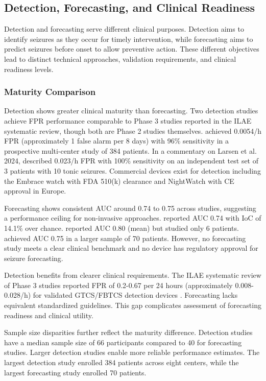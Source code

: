 \subsection{Detection, Forecasting, and Clinical Readiness}
\label{sec:detection-forecasting-readiness}

Detection and forecasting serve different clinical purposes. Detection aims to identify seizures as they occur for timely intervention, while forecasting aims to predict seizures before onset to allow preventive action. These different objectives lead to distinct technical approaches, validation requirements, and clinical readiness levels.

\subsubsection{Maturity Comparison}

Detection shows greater clinical maturity than forecasting. Two detection studies achieve FPR performance comparable to Phase 3 studies reported in the ILAE systematic review, though both are Phase 2 studies themselves. \textcite{spahrDeepLearningbasedDetection2025} achieved 0.0054/h FPR (approximately 1 false alarm per 8 days) with 96\% sensitivity in a prospective multi-center study of 384 patients. In a commentary on Larsen et al. 2024, \textcite{fineDetectionKeyAutomated2025} described 0.023/h FPR with 100\% sensitivity on an independent test set of 3 patients with 10 tonic seizures. Commercial devices exist for detection including the Embrace watch with FDA 510(k) clearance and NightWatch with CE approval in Europe.

Forecasting shows consistent AUC around 0.74 to 0.75 across studies, suggesting a performance ceiling for non-invasive approaches. \textcite{meiselMachineLearningWristband2020} reported AUC 0.74 with IoC of 14.1\% over chance. \textcite{nasseriAmbulatorySeizureForecasting2021} reported AUC 0.80 (mean) but studied only 6 patients. \textcite{vielufSeizureMonitoringCombined2025} achieved AUC 0.75 in a larger sample of 70 patients. However, no forecasting study meets a clear clinical benchmark and no device has regulatory approval for seizure forecasting.

Detection benefits from clearer clinical requirements. The ILAE systematic review of Phase 3 studies reported FPR of 0.2-0.67 per 24 hours (approximately 0.008-0.028/h) for validated GTCS/FBTCS detection devices \parencite{beniczkyAutomatedSeizureDetection2021}. Forecasting lacks equivalent standardized guidelines. This gap complicates assessment of forecasting readiness and clinical utility.

Sample size disparities further reflect the maturity difference. Detection studies have a median sample size of 66 participants compared to 40 for forecasting studies. Larger detection studies enable more reliable performance estimates. The largest detection study enrolled 384 patients across eight centers, while the largest forecasting study enrolled 70 patients.
